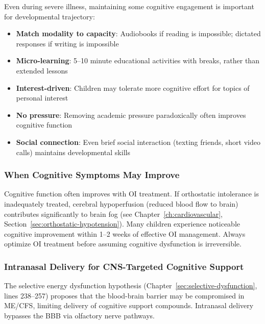 Even during severe illness, maintaining some cognitive engagement is important for developmental trajectory:

\begin{itemize}
    \item \textbf{Match modality to capacity}: Audiobooks if reading is impossible; dictated responses if writing is impossible
    \item \textbf{Micro-learning}: 5--10 minute educational activities with breaks, rather than extended lessons
    \item \textbf{Interest-driven}: Children may tolerate more cognitive effort for topics of personal interest
    \item \textbf{No pressure}: Removing academic pressure paradoxically often improves cognitive function
    \item \textbf{Social connection}: Even brief social interaction (texting friends, short video calls) maintains developmental skills
\end{itemize}

\subsubsection{When Cognitive Symptoms May Improve}

Cognitive function often improves with OI treatment. If orthostatic intolerance is inadequately treated, cerebral hypoperfusion (reduced blood flow to brain) contributes significantly to brain fog (see Chapter~\ref{ch:cardiovascular}, Section~\ref{sec:orthostatic-hypotension}). Many children experience noticeable cognitive improvement within 1--2 weeks of effective OI management. Always optimize OI treatment before assuming cognitive dysfunction is irreversible.

\subsubsection{Intranasal Delivery for CNS-Targeted Cognitive Support}

\begin{keypoint}
The selective energy dysfunction hypothesis (Chapter~\ref{sec:selective-dysfunction}, lines 238--257) proposes that the blood-brain barrier may be compromised in ME/CFS, limiting delivery of cognitive support compounds. Intranasal delivery bypasses the BBB via olfactory nerve pathways.
\end{keypoint}

